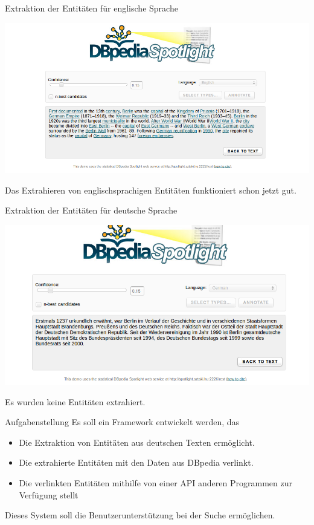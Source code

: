 \documentclass{beamer}
\begin{document}
  \begin{frame}[c]{Extraktion der Entitäten für englische Sprache}
  \begin{center}
   \includegraphics[width=0.8\linewidth]{pics/spotlight-english-1.png}
  \end{center}
  Das Extrahieren von englischsprachigen Entitäten funktioniert schon jetzt gut. 
  \end{frame}
  
  \begin{frame}[c]{Extraktion der Entitäten für deutsche Sprache}
  \begin{center}
    \begin{center}
      \includegraphics[width=0.8\linewidth]{pics/spotlight-deutsch.png}
    \end{center}
  \end{center}
  Es wurden keine Entitäten extrahiert.  
  \end{frame}
  
  \begin{frame}[c]{Aufgabenstellung}
  Es soll ein Framework entwickelt werden, das
  \begin{itemize}
  \item Die Extraktion von Entitäten aus deutschen Texten ermöglicht.
  \item Die extrahierte Entitäten mit den Daten aus DBpedia verlinkt.
  \item Die verlinkten Entitäten mithilfe von einer API anderen Programmen zur Verfügung stellt
  \end{itemize}
  Dieses System soll die Benutzerunterstützung bei der Suche ermöglichen.
  \end{frame}
  
\end{document}
